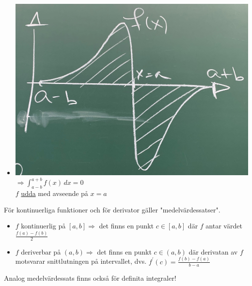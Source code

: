 \begin{itemize}
    \item \includegraphics[scale=0.1]{lessons/lesson15/imgs/img06.jpg}\\
          $\Rightarrow \int_{a-b}^{a+b} f(x)\, dx = 0$\\
          $f$ \underline{udda} med avseende på $x=a$
\end{itemize}

För kontinuerliga funktioner och för derivator gäller "medelvärdessatser".
\begin{itemize}
    \item $f$ kontinuerlig på $[a,b] \Rightarrow$ det finns en punkt $c\in[a,b]$ där $f$ antar värdet $\frac{f(a)-f(b)}{2}$
    \item $f$ deriverbar på $(a,b)\Rightarrow$ det finns en punkt $c\in(a,b)$ där derivatan av $f$ motsvarar snittlutningen på intervallet,
          dvs. $f^\prime(c)=\frac{f(b)-f(a)}{b-a}$
\end{itemize}

Analog medelvärdessats finns också för definita integraler!

